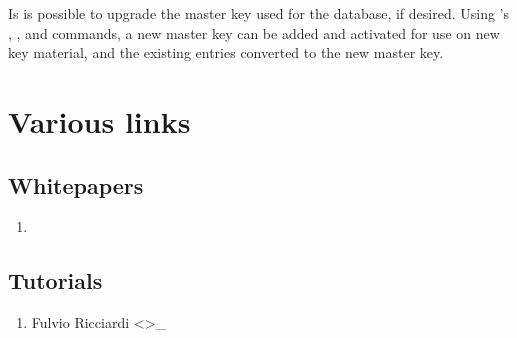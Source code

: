 \documentclass[letterpaper,10pt,english]{sphinxmanual}
\begin{document}
\sphinxAtStartPar
Is is possible to upgrade the master key used for the database, if
desired.  Using {\hyperref[\detokenize{admin/admin_commands/kdb5_util:kdb5-util-8}]{}}’s , , and
 commands, a new master key can be added
and activated for use on new key material, and the existing entries
converted to the new master key.


\chapter{Various links}
\label{\detokenize{admin/various_envs:various-links}}\label{\detokenize{admin/various_envs::doc}}

\section{Whitepapers}
\label{\detokenize{admin/various_envs:whitepapers}}\begin{enumerate}
%
\item {} 
\sphinxAtStartPar
{}

\end{enumerate}


\section{Tutorials}
\label{\detokenize{admin/various_envs:tutorials}}\begin{enumerate}
%
\item {} 
\sphinxAtStartPar
Fulvio Ricciardi  \textless{}\textgreater{}\_

\end{enumerate}
\end{document}
